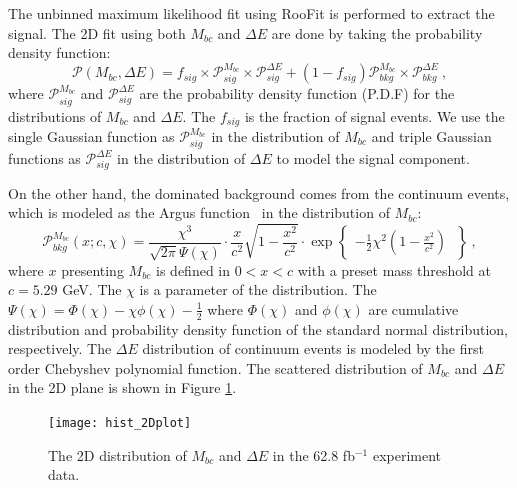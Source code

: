 The unbinned maximum likelihood fit using RooFit is performed to extract the signal. The 2D fit using both $M_{bc}$ and $\Delta{E}$ are done by taking the probability density function:
\begin{equation}\label{eq:pmbcde}
\mathcal{P}(M_{bc},\Delta{E}) = 
f_{sig}\times \mathcal{P}_{sig}^{M_{bc}}\times\mathcal{P}_{sig}^{\Delta{E}}
+ 
(1-f_{sig})\mathcal{P}_{bkg}^{M_{bc}}\times\mathcal{P}_{bkg}^{\Delta{E}} ~,
\end{equation}
where $\mathcal{P}_{sig}^{M_{bc}}$ and $\mathcal{P}_{sig}^{\Delta{E}}$ are the probability density function (P.D.F) for the distributions of $M_{bc}$ and $\Delta E$. The $f_{sig}$ is the fraction of signal events. We use the single Gaussian function as $\mathcal{P}_{sig}^{M_{bc}}$  in the distribution of $M_{bc}$ and triple Gaussian functions as $\mathcal{P}_{sig}^{\Delta{E}}$  in the distribution of $\Delta E$ to model the signal component. 

On the other hand, the dominated background comes from the continuum events, which is modeled as the Argus function~\cite{albrecht1990search} in the distribution of $M_{bc}$:
\begin{equation}\label{eq:Argus}
\mathcal{P}_{bkg}^{M_{bc}}(x;c,\chi)=\frac{\chi^3}{\sqrt{2\pi}\Psi(\chi)}\cdot
\frac{x}{c^2}\sqrt{1-\frac{x^2}{c^2}}\cdot
\exp \begin{Bmatrix}
-\frac{1}{2}\chi^2(1-\frac{x^2}{c^2}) ~
\end{Bmatrix}~,
\end{equation}
where $x$ presenting $M_{bc}$ is defined in $0<x<c$ with a preset mass threshold at $c = 5.29$ GeV. The $\chi$ is a parameter of the distribution. The $\Psi(\chi)=\Phi(\chi)-\chi\phi(\chi)-\frac{1}{2}$ where $\Phi(\chi)$ and $\phi(\chi)$ are cumulative distribution and probability density function of the standard normal distribution, respectively. The $\Delta E$ distribution of continuum events is modeled by the first order Chebyshev polynomial function. The scattered distribution of $M_{bc}$ and $\Delta E$ in the 2D plane is shown in Figure \ref{fig:hist_2Dplot}.

\begin{figure}[htbp]
		\centering 
		\texttt{[image: hist\_2Dplot]}
	\caption{The 2D distribution of $M_{bc}$ and $\Delta E$ in the 62.8 fb$^{-1}$ experiment data.}
	\label{fig:hist_2Dplot}
\end{figure}


